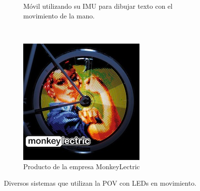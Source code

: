 \begin{figure}[!p]
\begin{subfigure}[t]{0.3\textwidth}
		\caption{Móvil utilizando su IMU para dibujar texto con el
		movimiento de la mano.}
		\label{fig:handPOV}
	\end{subfigure}
	\\
	\begin{subfigure}[t]{0.4\textwidth}
		\centering
		\includegraphics[width=\textwidth]{images/monkeyLight}
		\caption{Producto de la empresa MonkeyLectric}
		\label{fig:monkeyLight}
	\end{subfigure}

	\caption{Diversos sistemas que utilizan la POV con LEDs en movimiento.}
\end{figure}
